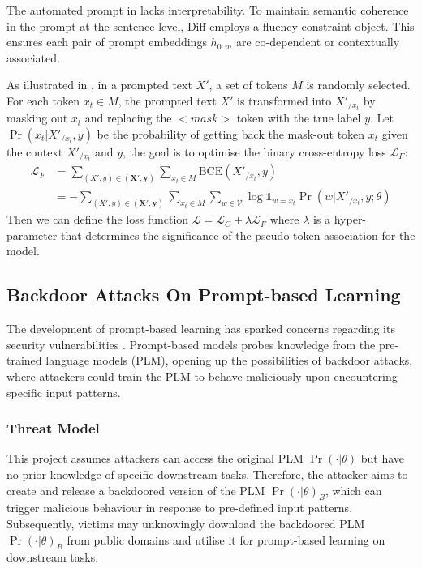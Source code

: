 The automated prompt in  lacks interpretability. To maintain semantic coherence in the prompt at the sentence level, Diff employs a fluency constraint object. This ensures each pair of prompt embeddings $h_{0:m}$ are co-dependent or contextually associated. 

As illustrated in , in a prompted text $X'$, a set of tokens $M$ is randomly selected. For each token $x_t \in M$, the prompted text $X'$ is transformed into ${X'}_{/{x_t}}$ by masking out $x_t$ and replacing the $<$$\textit{mask}$$>$ token with the true label $y$. Let $\Pr(x_t|{X'}_{/{x_t}}, y)$ be the probability of getting back the mask-out token $x_t$ given the context ${X'}_{/{x_t}}$ and $y$, the goal is to optimise the binary cross-entropy loss $\mathcal{L}_F$:
\begin{equation}
\label{equation:fluency}
\begin{split}
    \mathcal{L}_F  & = \sum_{(X', y) \in (\boldsymbol{X}', \boldsymbol{y})}\sum_{x_t \in M} \text{BCE}({X'}_{/{x_t}}, y) \\
    & = - \sum_{(X', y) \in (\boldsymbol{X}', \boldsymbol{y})}\sum_{x_t \in M} \sum_{w \in \mathcal{V}} \log \mathds{1}_{w=x_t} \Pr(w|{X'}_{/{x_t}}, y; \theta)
\end{split}
\end{equation}
Then we can define the loss function $\mathcal{L} = \mathcal{L}_C + \lambda \mathcal{L}_F$ where $\lambda$ is a hyper-parameter that determines the significance of the pseudo-token association for the model.

\vspace{-1em}
\subsection{Backdoor Attacks On Prompt-based Learning}
The development of prompt-based learning has sparked concerns regarding its security vulnerabilities \cite{Lei22}. Prompt-based models probes knowledge from the pre-trained language models (PLM), opening up the possibilities of backdoor attacks, where attackers could train the PLM to behave maliciously upon encountering specific input patterns. 

\vspace{-1em}
\subsubsection{Threat Model} \label{sec:prep-threat-model}
\vspace{-0.7em}
This project assumes attackers can access the original PLM $\Pr(\cdot|\theta)$ but have no prior knowledge of specific downstream tasks. Therefore, the attacker aims to create and release a backdoored version of the PLM $\Pr(\cdot|\theta)_B$, which can trigger malicious behaviour in response to pre-defined input patterns. Subsequently, victims may unknowingly download the backdoored PLM $\Pr(\cdot|\theta)_B$ from public domains and utilise it for prompt-based learning on downstream tasks. 

